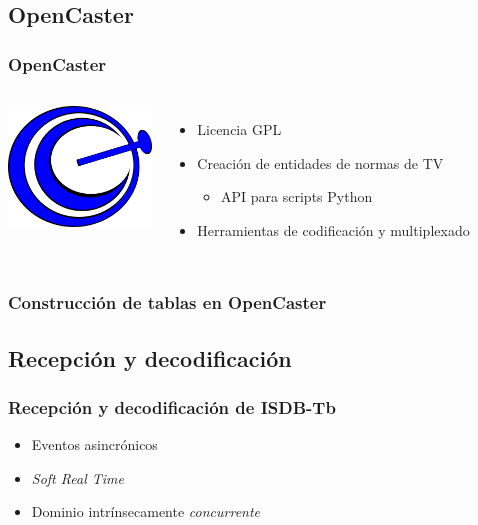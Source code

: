\documentclass[a4paper,11pt]{beamer}
\begin{document}
	\subsection{OpenCaster}
		\begin{frame}
			\frametitle{OpenCaster}
			\begin{columns}
				\begin{center}
					\includegraphics[height=3.2cm]{opencaster_logo.png}
				\end{center}
				
					\begin{itemize}
						\item Licencia GPL
						\item Creación de entidades de normas de TV
							\begin{itemize}
								\item API para scripts Python 
							\end{itemize}
						\item Herramientas de codificación y multiplexado
					\end{itemize}
			\end{columns}
		\end{frame}

		\begin{frame}
			\frametitle{Construcción de tablas en OpenCaster}
			\resizebox{7cm}{!}{
					
			}
		\end{frame}

	\subsection{Recepción y decodificación}
		\begin{frame}
			\frametitle{Recepción y decodificación de ISDB-Tb}
			\begin{itemize}
				\item Eventos asincrónicos
				\item \emph{Soft Real Time}
				\item Dominio intrínsecamente \emph{concurrente}
			\end{itemize}
		\end{frame}
\end{document}
